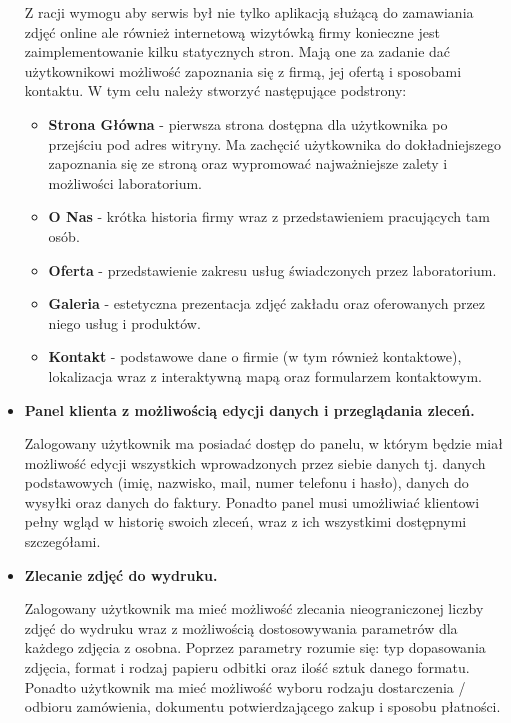 \begin{itemize}
    Z racji wymogu aby serwis był nie tylko aplikacją służącą do zamawiania zdjęć online ale również internetową wizytówką firmy konieczne jest zaimplementowanie kilku statycznych stron. Mają one za zadanie dać użytkownikowi możliwość zapoznania się z firmą, jej ofertą i sposobami kontaktu. W tym celu należy stworzyć następujące podstrony:
    \begin{itemize}
        \item \textbf{Strona Główna} - pierwsza strona dostępna dla użytkownika po przejściu pod adres witryny. Ma zachęcić użytkownika do dokładniejszego zapoznania się ze stroną oraz wypromować najważniejsze zalety i możliwości laboratorium.
        \item \textbf{O Nas} - krótka historia firmy wraz z przedstawieniem pracujących tam osób.
        \item \textbf{Oferta} - przedstawienie zakresu usług świadczonych przez laboratorium. 
        \item \textbf{Galeria} - estetyczna prezentacja zdjęć zakładu oraz oferowanych przez niego usług i produktów.
        \item \textbf{Kontakt} - podstawowe dane o firmie (w tym również kontaktowe), lokalizacja wraz z interaktywną mapą oraz formularzem kontaktowym.
    \end{itemize}
    
    \item \textbf{Panel klienta z możliwością edycji danych i przeglądania zleceń.}
    
    Zalogowany użytkownik ma posiadać dostęp do panelu, w którym będzie miał możliwość edycji wszystkich wprowadzonych przez siebie danych tj. danych podstawowych (imię, nazwisko, mail, numer telefonu i hasło), danych do wysyłki oraz danych do faktury. Ponadto panel musi umożliwiać klientowi pełny wgląd w historię swoich zleceń, wraz z ich wszystkimi dostępnymi szczegółami.
    
    \item \textbf{Zlecanie zdjęć do wydruku.}

    Zalogowany użytkownik ma mieć możliwość zlecania nieograniczonej liczby zdjęć do wydruku wraz z możliwością dostosowywania parametrów dla każdego zdjęcia z osobna. Poprzez parametry rozumie się: typ dopasowania zdjęcia, format i rodzaj papieru odbitki oraz ilość sztuk danego formatu. Ponadto użytkownik ma mieć możliwość wyboru rodzaju dostarczenia / odbioru zamówienia, dokumentu potwierdzającego zakup i sposobu płatności.
    

\end{itemize}

